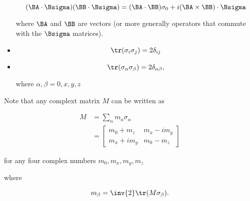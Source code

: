 \begin{itemize}
\begin{equation}\label{eqn:qmTwoL14:570}
(\BA \cdot \Bsigma)
(\BB \cdot \Bsigma)
=
(\BA \cdot \BB) \sigma_0 + i (\BA \times \BB) \cdot \Bsigma
\end{equation}

where $\BA$ and $\BB$ are vectors (or more generally operators that commute with the $\Bsigma$ matrices).

\item

\begin{equation}\label{eqn:qmTwoL14:590}
\tr(\sigma_i \sigma_j) = 2 \delta_{ij}
\end{equation}

\item

\begin{equation}\label{eqn:qmTwoL14:610}
\tr(\sigma_\alpha \sigma_\beta) = 2 \delta_{\alpha \beta},
\end{equation}

where $\alpha, \beta = 0, x, y, z$
\end{itemize}

Note that any complext matrix $M$ can be written as

\begin{equation}\label{eqn:qmTwoL14:920}
\begin{aligned}
M &= \sum_\alpha m_a \sigma_\alpha \\
  &=
\begin{bmatrix}
m_0 + m_z & m_x - i m_y \\
m_x + i m_y & m_0 - m_z
\end{bmatrix}
\end{aligned}
\end{equation}

for any four complex numbers $m_0, m_x, m_y, m_z$

where

\begin{equation}\label{eqn:qmTwoL14:630}
m_\beta = \inv{2} \tr(M \sigma_\beta).
\end{equation}

\EndArticle
